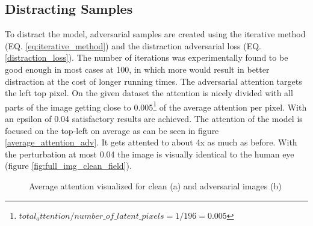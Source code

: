 \subsection*{Distracting Samples}
To distract the model, adversarial samples are created using the iterative method (EQ. \ref{eq:iterative_method}) and the distraction adversarial loss (EQ. \ref{distraction_loss}). The number of iterations was experimentally found to be good enough in most cases at 100, in which more would result in better distraction at the cost of longer running times. The adversarial attention targets the left top pixel. On the given dataset the attention is nicely divided with all parts of the image getting close to 0.005\footnote[1]{$total_attention / number\_of\_latent\_pixels = 1 / 196 = 0.005$} of the average attention per pixel. With an epsilon of 0.04 satisfactory results are achieved. The attention of the model is focused on the top-left on average as can be seen in figure \ref{average_attention_adv}. It gets attented to about 4x as much as before. With the perturbation at most 0.04 the image is visually identical to the human eye (figure \ref{fig:full_img_clean_field}).

\begin{figure}[H]
    \centering
    \vspace{\floatsep}
    \caption{Average attention visualized for clean (a) and adversarial images (b)}
    \label{average_attention}
\end{figure}


